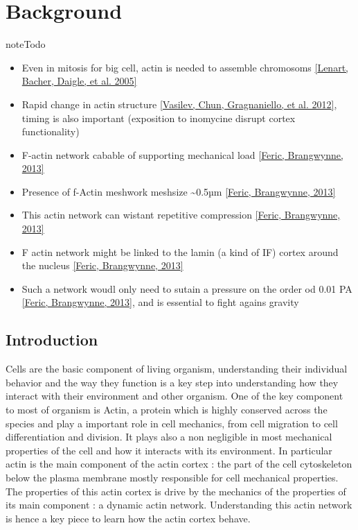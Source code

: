 \documentclass[A4paperpaper,11pt,english]{sphinxmanual}
\begin{document}
\chapter{Background}
\label{parts/part1::doc}\label{parts/part1:background}\label{parts/part1:contents}
\begin{notice}{note}{Todo}
\begin{itemize}
\item {} 
Even in mitosis for big cell, actin is needed to assemble chromosoms {\hyperref[bibitem:lenart2005]{{[}Lenart, Bacher, Daigle,  et al.  2005{]}}}

\item {} 
Rapid change in actin structure {\hyperref[bibitem:vasilev2012]{{[}Vasilev, Chun, Gragnaniello,  et al.  2012{]}}}, timing is also important (exposition to inomycine disrupt cortex functionality)

\item {} 
F-actin network cabable of supporting mechanical load {\hyperref[bibitem:feric2013]{{[}Feric, Brangwynne,  2013{]}}}

\item {} 
Presence of f-Actin meshwork meshsize \textasciitilde{}0.5µm {\hyperref[bibitem:feric2013]{{[}Feric, Brangwynne,  2013{]}}}

\item {} 
This actin network can wistant repetitive compression {\hyperref[bibitem:feric2013]{{[}Feric, Brangwynne,  2013{]}}}

\item {} 
F actin network might be linked to the lamin (a kind of IF) cortex around the nucleus {\hyperref[bibitem:feric2013]{{[}Feric, Brangwynne,  2013{]}}}

\item {} 
Such a network woudl only need to sutain a pressure on the order od 0.01 PA {\hyperref[bibitem:feric2013]{{[}Feric, Brangwynne,  2013{]}}},
and is essential to fight agains gravity

\end{itemize}
\end{notice}


\section{Introduction}
\label{parts/part1:introduction}
Cells are the basic component of living organism, understanding their
individual behavior and the way they function is a key step into understanding
how they interact with their environment and other organism. One of the key
component to most of organism is Actin, a protein which is highly conserved
across the species and play a important role in cell mechanics, from cell
migration to cell differentiation and division. It plays also a non negligible
in most mechanical properties of the cell and how it interacts with its
environment. In particular actin is the main component of the actin cortex :
the part of the cell cytoskeleton below the plasma membrane mostly responsible
for cell mechanical properties. The properties of this actin cortex is drive by
the mechanics of the properties of its main component : a dynamic actin
network. Understanding this actin network is hence a key piece to learn how
the actin cortex behave.
\end{document}
